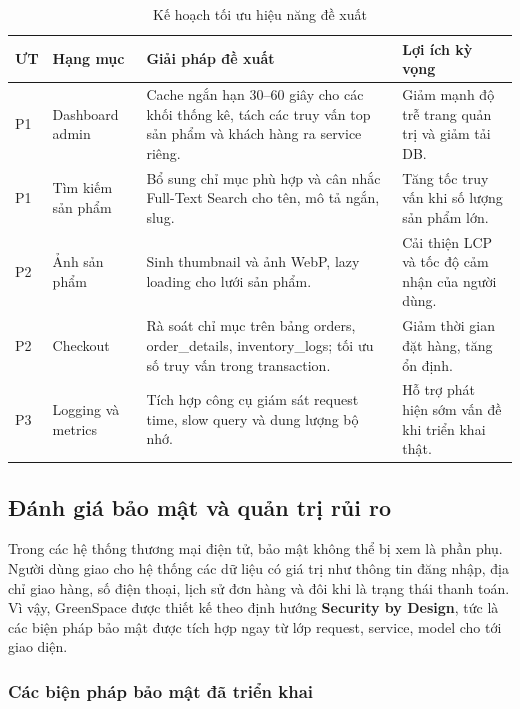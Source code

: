 \documentclass[11pt, a4paper]{article}
\begin{document}
\begin{table}[H]
    \centering
    \caption{Kế hoạch tối ưu hiệu năng đề xuất}
    \label{tab:perf-plan}
    \begin{tabularx}{\linewidth}{|>{\centering\arraybackslash}p{1.3cm}
                                  |>{\raggedright\arraybackslash}p{4.2cm}
                                  |>{\raggedright\arraybackslash}p{4.8cm}
                                  |Y|}
        \hline
        \textbf{ƯT} & \textbf{Hạng mục} & \textbf{Giải pháp đề xuất} & \textbf{Lợi ích kỳ vọng} \\ \hline
        P1 & Dashboard admin & Cache ngắn hạn 30--60 giây cho các khối thống kê, tách các truy vấn top sản phẩm và khách hàng ra service riêng. & Giảm mạnh độ trễ trang quản trị và giảm tải DB. \\ \hline
        P1 & Tìm kiếm sản phẩm & Bổ sung chỉ mục phù hợp và cân nhắc Full-Text Search cho tên, mô tả ngắn, slug. & Tăng tốc truy vấn khi số lượng sản phẩm lớn. \\ \hline
        P2 & Ảnh sản phẩm & Sinh thumbnail và ảnh WebP, lazy loading cho lưới sản phẩm. & Cải thiện LCP và tốc độ cảm nhận của người dùng. \\ \hline
        P2 & Checkout & Rà soát chỉ mục trên bảng orders, order\_details, inventory\_logs; tối ưu số truy vấn trong transaction. & Giảm thời gian đặt hàng, tăng ổn định. \\ \hline
        P3 & Logging và metrics & Tích hợp công cụ giám sát request time, slow query và dung lượng bộ nhớ. & Hỗ trợ phát hiện sớm vấn đề khi triển khai thật. \\ \hline
    \end{tabularx}
\end{table}

\clearpage
\subsection{Đánh giá bảo mật và quản trị rủi ro}

Trong các hệ thống thương mại điện tử, bảo mật không thể bị xem là phần phụ.
Người dùng giao cho hệ thống các dữ liệu có giá trị như thông tin đăng nhập,
địa chỉ giao hàng, số điện thoại, lịch sử đơn hàng và đôi khi là trạng thái
thanh toán. Vì vậy, GreenSpace được thiết kế theo định hướng \textbf{Security by Design},
tức là các biện pháp bảo mật được tích hợp ngay từ lớp request, service, model
cho tới giao diện.

\subsubsection{Các biện pháp bảo mật đã triển khai}
\end{document}
